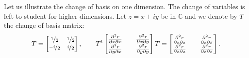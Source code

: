 \documentclass[12pt,openany]{book}
\newcommand{\C}{{\mathbb{C}}}
\theoremstyle{plain}
\theoremstyle{remark}
\theoremstyle{definition}
\theoremstyle{exercise}
\theoremstyle{example}
\begin{document}
Let us illustrate the change of basis on one dimension.  The change of
variables is left to student for higher dimensions.  Let $z =
x+iy$ be in $\C$ and we denote by $T$ the change of basis matrix:
\begin{equation*}
T = 
\begin{bmatrix}
\nicefrac{1}{2} & \nicefrac{1}{2} \\
\nicefrac{-i}{2} & \nicefrac{i}{2}
\end{bmatrix}
,
\qquad
T^t
\begin{bmatrix}
\frac{\partial^2 r}{\partial x \partial x} &&
\frac{\partial^2 r}{\partial x \partial y}
\\
\frac{\partial^2 r}{\partial y \partial x} &&
\frac{\partial^2 r}{\partial y \partial y}
\end{bmatrix}
T
=
\begin{bmatrix}
\frac{\partial^2 r}{\partial z \partial z} &&
\frac{\partial^2 r}{\partial z \partial \bar{z}}
\\
\frac{\partial^2 r}{\partial \bar{z} \partial z} &&
\frac{\partial^2 r}{\partial \bar{z} \partial \bar{z}}
\end{bmatrix}
.
\end{equation*}
\end{document}
